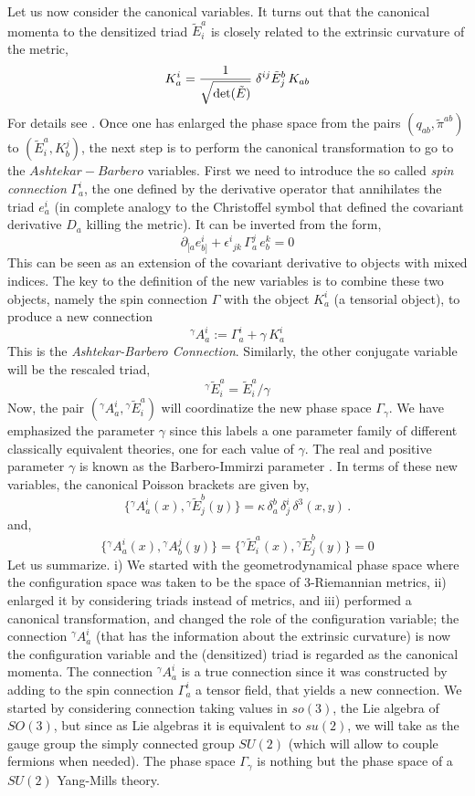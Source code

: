 \documentclass[aps,prd,tightenlines,showpacs,nofootinbib,preprint]{revtex4}
\def\be{\begin{equation}}
\def\ee{\end{equation}}
\def\tE{\tilde{E}}
\def\G{{\Gamma}}  \def\h{\hat} \def\H{{\cal H}} \def\O{{\cal O}}
\def\g{{\gamma}}  \def\a{{\alpha}} \def\l{{\lambda}}
\begin{document}
Let us now consider the canonical variables. It turns out that the
canonical momenta to the densitized triad $\tE^a_i$ is closely
related to the extrinsic curvature of the metric, \be
K^i_a=\frac{1}{\sqrt{{{\rm
det}(\tE)}}}\;\delta^{ij}\tE^b_j\,K_{ab} \ee For details see
\cite{Perez:2004hj}. Once one has enlarged the phase space from
the pairs $(q_{ab},\tilde{\pi}^{ab})$ to $(\tE^a_i,K_b^j)$, the
next step is to perform the canonical transformation to go to the
$Ashtekar-Barbero$ variables. First we need to introduce the so
called {\it spin connection} $\G^i_a$, the one defined by the
derivative operator that annihilates the triad $e_a^i$ (in
complete analogy to the Christoffel symbol that defined the
covariant derivative $D_a$ killing the metric). It can be inverted
from the form,
%
\be
\partial_{[a}e^i_{b]} +{\epsilon^i}_{jk}\,\G^j_a\, e^k_b=0
\ee This can be seen as an extension of the covariant derivative
to objects with mixed indices. The key to the definition of the
new variables is to combine these two objects, namely the spin
connection $\G$ with the object $K^i_a$ (a tensorial object), to
produce a new connection
%
\be {}^{\gamma}\!A_a^i:=\G^i_a+\gamma\,K^i_a
\ee
%
This is the {\it Ashtekar-Barbero Connection}. Similarly, the
other conjugate variable will be the rescaled triad,
%
\be
{}^{\gamma}\!\tE^a_i=\tE^a_i/\gamma
\ee
%
Now, the pair $({}^{\gamma}\!A_a^i, {}^{\gamma}\!\tE^a_i)$ will
coordinatize the new phase space $\G_\gamma$. We have emphasized
the parameter $\g$ since this labels a one parameter family of
different classically equivalent theories, one for each value of
$\gamma$. The real and positive parameter $\g$ is known as the
Barbero-Immirzi parameter \cite{barbero,Immirzi}. In terms of
these new variables, the canonical Poisson brackets are given by,
\be \{ {}^{\gamma}\!A_a^i(x),
{}^{\gamma}\!\tE^b_j(y)\}=\kappa\,\delta^b_a\,\delta^i_j\,\delta^3(x,y)\,
. \ee and, \be \{ {}^{\gamma}\!A_a^i(x),
{}^{\gamma}\!A_b^j(y)\}=\{{}^{\gamma}\!\tE^a_i(x),
{}^{\gamma}\!\tE^b_j(y)\}=0 \ee Let us summarize. i) We started
with the geometrodynamical phase space where the configuration
space was taken to be the space of 3-Riemannian metrics, ii)
enlarged it by considering triads instead of metrics, and iii)
performed a canonical transformation, and changed the role of the
configuration variable; the connection ${}^{\gamma}\!A_a^i$ (that
has the information about the extrinsic curvature) is now the
configuration variable and the (densitized) triad is regarded as
the canonical momenta. The connection ${}^{\gamma}\!A_a^i$ is a
true connection since it was constructed by adding to the spin
connection $\G^i_a$ a tensor field, that yields a new connection.
We started by considering connection taking values in $so(3)$, the
Lie algebra of $SO(3)$, but since as Lie algebras it is equivalent
to $su(2)$, we will take as the gauge group the simply connected
group $SU(2)$ (which will allow to couple fermions when needed).
The phase space $\G_\g$ is nothing but the phase space of a
$SU(2)$ Yang-Mills theory.
\end{document}
